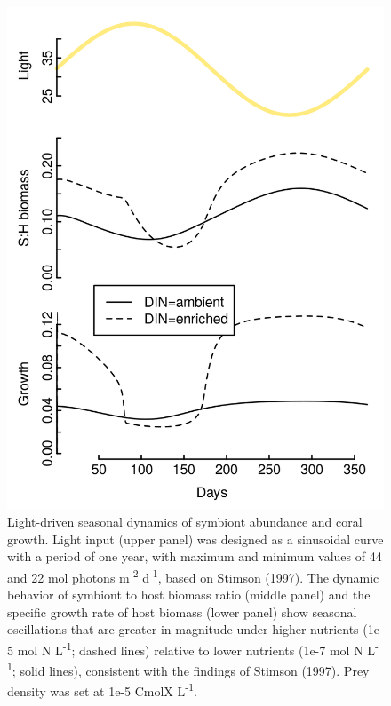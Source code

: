 \documentclass[]{elsarticle} %
\makeatletter
\def\maxwidth{\ifdim\Gin@nat@width>\linewidth\linewidth
\else\Gin@nat@width\fi}
\let\Oldincludegraphics\includegraphics
\renewcommand{\includegraphics}[1]{\Oldincludegraphics[width=\maxwidth]{#1}}
\makeatother
\begin{document}
\begin{figure}[htbp]
\centering
\includegraphics{../img/Fig5.png}
\caption{Light-driven seasonal dynamics of symbiont abundance and coral
growth. Light input (upper panel) was designed as a sinusoidal curve
with a period of one year, with maximum and minimum values of 44 and 22
mol photons m\textsuperscript{-2} d\textsuperscript{-1}, based on
Stimson (1997). The dynamic behavior of symbiont to host biomass ratio
(middle panel) and the specific growth rate of host biomass (lower
panel) show seasonal oscillations that are greater in magnitude under
higher nutrients (1e-5 mol N L\textsuperscript{-1}; dashed lines)
relative to lower nutrients (1e-7 mol N L\textsuperscript{-1}; solid
lines), consistent with the findings of Stimson (1997). Prey density was
set at 1e-5 CmolX L\textsuperscript{-1}.}
\end{figure}
\end{document}

